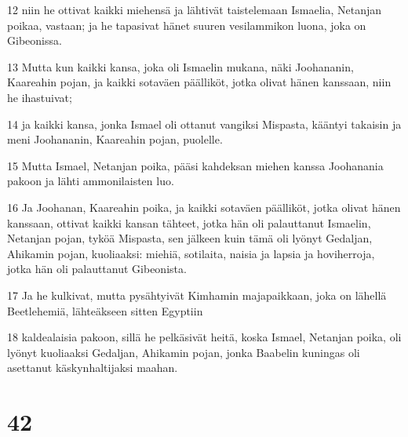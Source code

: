 \par 12 niin he ottivat kaikki miehensä ja lähtivät taistelemaan Ismaelia, Netanjan poikaa, vastaan; ja he tapasivat hänet suuren vesilammikon luona, joka on Gibeonissa.
\par 13 Mutta kun kaikki kansa, joka oli Ismaelin mukana, näki Joohananin, Kaareahin pojan, ja kaikki sotaväen päälliköt, jotka olivat hänen kanssaan, niin he ihastuivat;
\par 14 ja kaikki kansa, jonka Ismael oli ottanut vangiksi Mispasta, kääntyi takaisin ja meni Joohananin, Kaareahin pojan, puolelle.
\par 15 Mutta Ismael, Netanjan poika, pääsi kahdeksan miehen kanssa Joohanania pakoon ja lähti ammonilaisten luo.
\par 16 Ja Joohanan, Kaareahin poika, ja kaikki sotaväen päälliköt, jotka olivat hänen kanssaan, ottivat kaikki kansan tähteet, jotka hän oli palauttanut Ismaelin, Netanjan pojan, tyköä Mispasta, sen jälkeen kuin tämä oli lyönyt Gedaljan, Ahikamin pojan, kuoliaaksi: miehiä, sotilaita, naisia ja lapsia ja hoviherroja, jotka hän oli palauttanut Gibeonista.
\par 17 Ja he kulkivat, mutta pysähtyivät Kimhamin majapaikkaan, joka on lähellä Beetlehemiä, lähteäkseen sitten Egyptiin
\par 18 kaldealaisia pakoon, sillä he pelkäsivät heitä, koska Ismael, Netanjan poika, oli lyönyt kuoliaaksi Gedaljan, Ahikamin pojan, jonka Baabelin kuningas oli asettanut käskynhaltijaksi maahan.

\chapter{42}

